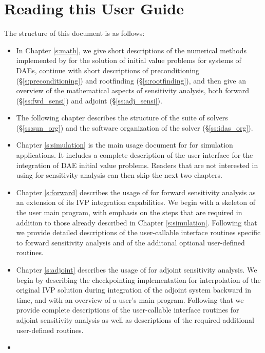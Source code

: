 \section{Reading this User Guide}\label{ss:reading}

The structure of this document is as follows:
\begin{itemize}
\item
  In Chapter \ref{s:math}, we give short descriptions of the numerical 
  methods implemented by {\idas} for the solution of initial value problems
  for systems of DAEs, continue with short descriptions of preconditioning
  (\S\ref{s:preconditioning}) and rootfinding (\S\ref{s:rootfinding}), and
  then give an overview of the mathematical aspects of sensitivity analysis,
  both forward (\S\ref{ss:fwd_sensi}) and adjoint (\S\ref{ss:adj_sensi}).
\item
  The following chapter describes the structure of the {\sundials} suite
  of solvers (\S\ref{ss:sun_org}) and the software organization of the {\idas}
  solver (\S\ref{ss:idas_org}). 
\item
  Chapter \ref{s:simulation} is the main usage document for {\idas}
  for simulation applications.  It includes a complete description of
  the user interface for the integration of DAE initial value problems.
  Readers that are not interested in using {\idas} for sensitivity
  analysis can then skip the next two chapters.
\item
  Chapter \ref{s:forward} describes the usage of {\idas} for forward
  sensitivity analysis as an extension of its IVP integration
  capabilities.  We begin with a skeleton of the user main program,
  with emphasis on the steps that are required in addition to those
  already described in Chapter \ref{s:simulation}.  Following that we
  provide detailed descriptions of the user-callable interface
  routines specific to forward sensitivity analysis and of the
  additonal optional user-defined routines.
\item
  Chapter \ref{s:adjoint} describes the usage of {\idas} for adjoint
  sensitivity analysis. We begin by describing the {\idas} checkpointing 
  implementation for interpolation of the original IVP solution during
  integration of the adjoint system backward in time, and with 
  an overview of a user's main program. Following that we provide complete
  descriptions of the user-callable interface routines for adjoint sensitivity
  analysis as well as descriptions of the required additional user-defined routines.
\item

\end{itemize}
